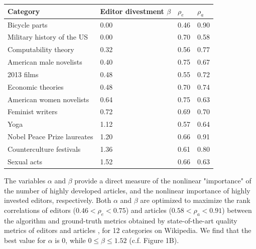 \documentclass[letterpaper,10pt,a4paper]{article}
\begin{document}
\begin{table}
\begin{tabular}{llll}
\toprule
                              Category & Editor divestment $\beta$  & $\rho_e$ & $\rho_a$ \\
\midrule
                         Bicycle parts &    0.00 &     0.46 &     0.90 \\
 Military history of the US &    0.00 &     0.70 &     0.58 \\
                  Computability theory &    0.32 &     0.56 &     0.77 \\
               American male novelists &    0.40 &     0.75 &     0.67 \\
                            2013 films &    0.48 &     0.55 &     0.72 \\
                     Economic theories &    0.48 &     0.70 &     0.74 \\
              American women novelists &    0.64 &     0.75 &     0.63 \\
                      Feminist writers &    0.72 &     0.69 &     0.70 \\
                                  Yoga &    1.12 &     0.57 &     0.64 \\
           Nobel Peace Prize laureates &    1.20 &     0.66 &     0.91 \\
              Counterculture festivals &    1.36 &     0.61 &     0.80 \\
                           Sexual acts &    1.52 &     0.66 &     0.63 \\
\bottomrule
\end{tabular}


\end{table}



The variables $\alpha$ and $\beta$ provide a direct measure of the nonlinear "importance" of the number of highly developed articles, and the nonlinear importance of highly invested editors, respectively. Both $\alpha$ and $\beta$ are optimized to maximize the rank correlations of editors ($0.46 < \rho_e < 0.75 $) and articles ($0.58 < \rho_a < 0.91$) between the algorithm and ground-truth metrics obtained by state-of-the-art quality metrics of editors \cite{geiger2013} and articles \cite{wang}, for 12 categories on Wikipedia. We find that the best value for $\alpha$ is $0$, while $0 \leqslant \beta \leqslant 1.52$ (c.f. Figure 1B). 

\end{document}
